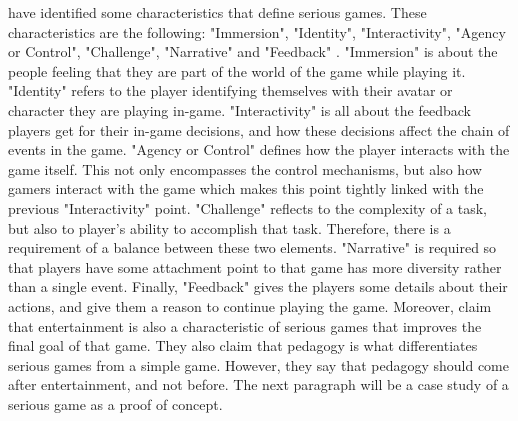 \documentclass{l4proj}
\begin{document}
\citet{blumberg_serious_2012} have identified some characteristics that define serious games. These characteristics are the following: "Immersion", "Identity",
"Interactivity", "Agency or Control", "Challenge", "Narrative" and "Feedback" \citep{blumberg_serious_2012}.
"Immersion" is about the people feeling that they are part of the world of the game while playing it. 
"Identity" refers to the player identifying themselves with their avatar or character they are playing in-game.
"Interactivity" is all about the feedback players get for their in-game decisions, and how these decisions affect the chain of events in the game.
"Agency or Control" defines how the player interacts with the game itself. This not only encompasses the control mechanisms, 
but also how gamers interact with the game which makes this point tightly linked with the previous "Interactivity" point.
"Challenge" reflects to the complexity of a task, but also to player's ability to accomplish that task. Therefore, there is a requirement of a balance between these two elements.
"Narrative" is required so that players have some attachment point to that game has more diversity rather than a single event.
Finally, "Feedback" gives the players some details about their actions, and give them a reason to continue playing the game.
Moreover, \citet{susi_serious_2007} claim that entertainment is also a characteristic of serious games that improves the final goal of that game.
They also claim that pedagogy is what differentiates serious games from a simple game. However, they say that pedagogy should come after entertainment, and not before.
The next paragraph will be a case study of a serious game as a proof of concept.
\end{document}
